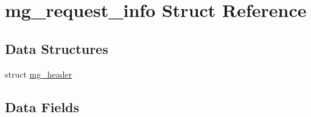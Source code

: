 \hypertarget{structmg__request__info}{}\section{mg\+\_\+request\+\_\+info Struct Reference}
\label{structmg__request__info}
\subsection*{Data Structures}
\begin{DoxyCompactItemize}
\item 
struct \mbox{\hyperlink{structmg__request__info_1_1mg__header}{mg\+\_\+header}}
\end{DoxyCompactItemize}
\subsection*{Data Fields}
